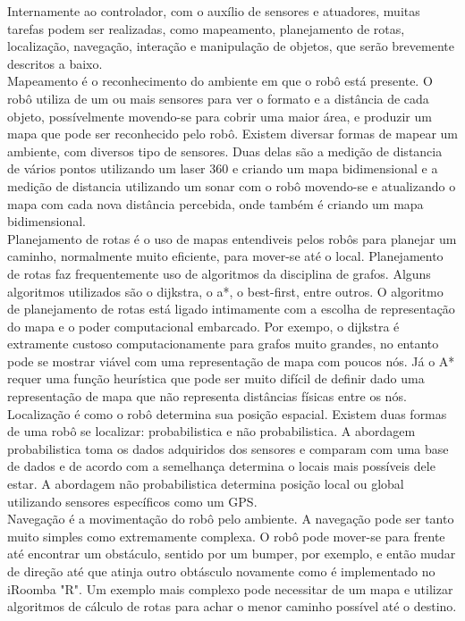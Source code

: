 \documentclass{article}
\begin{document}
Internamente ao controlador, com o auxílio de sensores e atuadores, muitas tarefas podem ser realizadas, como mapeamento, planejamento de rotas, localização, navegação, interação e manipulação de objetos, que serão brevemente descritos a baixo.\\

Mapeamento é o reconhecimento do ambiente em que o robô está presente. O robô utiliza de um ou mais sensores para ver o formato e a distância de cada objeto, possívelmente movendo-se para cobrir uma maior área, e produzir um mapa que pode ser reconhecido pelo robô. Existem diversar formas de mapear um ambiente, com diversos tipo de sensores. Duas delas são a medição de distancia de vários pontos utilizando um laser 360 e criando um mapa bidimensional e a medição de distancia utilizando um sonar com o robô movendo-se e atualizando o mapa com cada nova distância percebida, onde também é criando um mapa bidimensional.\\ 

Planejamento de rotas é o uso de mapas entendiveis pelos robôs para planejar um caminho, normalmente muito eficiente, para mover-se até o local. Planejamento de rotas faz frequentemente uso de algoritmos da disciplina de grafos. Alguns algoritmos utilizados são o dijkstra, o a*, o best-first, entre outros. O algoritmo de planejamento de rotas está ligado intimamente com a escolha de representação do mapa e o poder computacional embarcado. Por exempo, o dijkstra é extramente custoso computacionamente para grafos muito grandes, no entanto pode se mostrar viável com uma representação de mapa com poucos nós. Já o A* requer uma função heurística que pode ser muito difícil de definir dado uma representação de mapa que não representa distâncias físicas entre os nós.\\

Localização é como o robô determina sua posição espacial. Existem duas formas de uma robô se localizar: probabilistica e não probabilistica. A abordagem probabilistica toma os dados adquiridos dos sensores e comparam com uma base de dados e de acordo com a semelhança determina o locais mais possíveis dele estar. A abordagem não probabilistica determina posição local ou global utilizando sensores específicos como um GPS.\\

Navegação é a movimentação do robô pelo ambiente. A navegação pode ser tanto muito simples como extremamente complexa. O robô pode mover-se para frente até encontrar um obstáculo, sentido por um bumper, por exemplo, e então mudar de direção até que atinja outro obtásculo novamente como é implementado no iRoomba "R".  Um exemplo mais complexo pode necessitar de um mapa e utilizar algoritmos de cálculo de rotas para achar o menor caminho possível até o destino.\\
\end{document}
